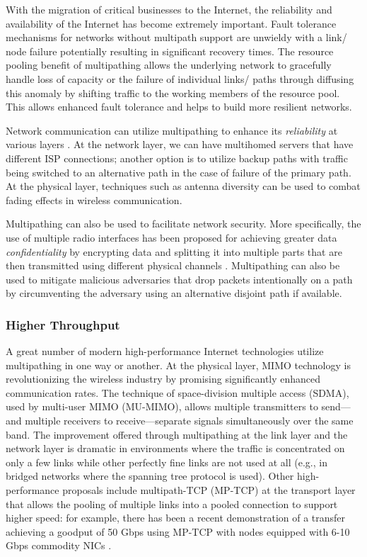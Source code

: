 \documentclass[10pt]{IEEEtran}
\begin{document}
With the migration of critical businesses to the Internet, the reliability and availability of the Internet has become extremely important. Fault tolerance mechanisms for networks without multipath support are unwieldy with a link/ node failure potentially resulting in significant recovery times. The resource pooling benefit of multipathing allows the underlying network to gracefully handle loss of capacity or the failure of individual links/ paths through diffusing this anomaly by shifting traffic to the working members of the resource pool. This allows enhanced fault tolerance and helps to build more resilient networks.

Network communication can utilize multipathing to enhance its \textit{reliability} at various layers \cite{bailis2014network}. At the network layer, we can have multihomed servers that have different ISP connections; another option is to utilize backup paths with traffic being switched to an alternative path in the case of failure of the primary path. At the physical layer, techniques such as antenna diversity can be used to combat fading effects in wireless communication. 

Multipathing can also be used to facilitate network security. More specifically, the use of multiple radio interfaces has been proposed for achieving greater data \textit{confidentiality} by encrypting data and splitting it into multiple parts that are then transmitted using different physical channels \cite{ye2008improving}. Multipathing can also be used to mitigate malicious adversaries that drop packets intentionally on a path by circumventing the adversary using an alternative disjoint path if available. 



\vspace{1mm}
\subsubsection{Higher Throughput} A great number of modern high-performance Internet technologies utilize multipathing in one way or another. At the physical layer, MIMO technology is revolutionizing the wireless industry by promising significantly enhanced communication rates. The technique of space-division multiple access (SDMA), used by multi-user MIMO (MU-MIMO), allows multiple transmitters to send---and multiple receivers to receive---separate signals simultaneously over the same band. The improvement offered through multipathing at the link layer and the network layer is dramatic in environments where the traffic is concentrated on only a few links while other perfectly fine links are not used at all (e.g., in bridged networks where the spanning tree protocol is used). Other high-performance proposals include multipath-TCP (MP-TCP) at the transport layer that allows the pooling of multiple links into a pooled connection to support higher speed: for example, there has been a recent demonstration of a transfer achieving a goodput of 50 Gbps using MP-TCP with nodes equipped with 6-10 Gbps commodity NICs \cite{fastestTCP}.
\end{document}
